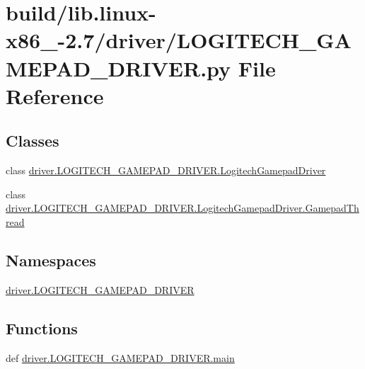 \hypertarget{build_2lib_8linux-x86__64-2_87_2driver_2LOGITECH__GAMEPAD__DRIVER_8py}{}\section{build/lib.linux-\/x86\+\_-\/2.7/driver/\+L\+O\+G\+I\+T\+E\+C\+H\+\_\+\+G\+A\+M\+E\+P\+A\+D\+\_\+\+D\+R\+I\+V\+E\+R.py File Reference}
\label{build_2lib_8linux-x86__64-2_87_2driver_2LOGITECH__GAMEPAD__DRIVER_8py}
\subsection*{Classes}
\begin{DoxyCompactItemize}
\item 
class \hyperlink{classdriver_1_1LOGITECH__GAMEPAD__DRIVER_1_1LogitechGamepadDriver}{driver.\+L\+O\+G\+I\+T\+E\+C\+H\+\_\+\+G\+A\+M\+E\+P\+A\+D\+\_\+\+D\+R\+I\+V\+E\+R.\+Logitech\+Gamepad\+Driver}
\item 
class \hyperlink{classdriver_1_1LOGITECH__GAMEPAD__DRIVER_1_1LogitechGamepadDriver_1_1GamepadThread}{driver.\+L\+O\+G\+I\+T\+E\+C\+H\+\_\+\+G\+A\+M\+E\+P\+A\+D\+\_\+\+D\+R\+I\+V\+E\+R.\+Logitech\+Gamepad\+Driver.\+Gamepad\+Thread}
\end{DoxyCompactItemize}
\subsection*{Namespaces}
\begin{DoxyCompactItemize}
\item 
 \hyperlink{namespacedriver_1_1LOGITECH__GAMEPAD__DRIVER}{driver.\+L\+O\+G\+I\+T\+E\+C\+H\+\_\+\+G\+A\+M\+E\+P\+A\+D\+\_\+\+D\+R\+I\+V\+E\+R}
\end{DoxyCompactItemize}
\subsection*{Functions}
\begin{DoxyCompactItemize}
\item 
def \hyperlink{namespacedriver_1_1LOGITECH__GAMEPAD__DRIVER_aaa658f6556352e0d77c8437b019f41f9}{driver.\+L\+O\+G\+I\+T\+E\+C\+H\+\_\+\+G\+A\+M\+E\+P\+A\+D\+\_\+\+D\+R\+I\+V\+E\+R.\+main}
\end{DoxyCompactItemize}
